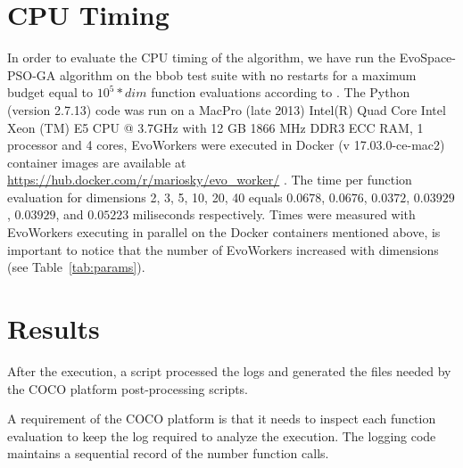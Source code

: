 \documentclass[sigconf]{acmart}
\begin{document}
%
\section{CPU Timing}
In order to evaluate the CPU timing of the algorithm, we have run the EvoSpace-PSO-GA algorithm 
on the  bbob test suite \cite{hansen2009fun} with no restarts for a maximum budget 
equal to  $10^5*dim$ function evaluations according to \cite{hansen2016exp}. 
The Python (version 2.7.13) code was run on a MacPro (late 2013) Intel(R) Quad Core 
Intel Xeon (TM) E5 CPU @ 3.7GHz with 12 GB 1866 MHz DDR3 ECC RAM, 1 processor and 4 cores, 
EvoWorkers were executed in Docker (v 17.03.0-ce-mac2) container images are available at
\url{https://hub.docker.com/r/mariosky/evo_worker/} . 
The time per function evaluation for dimensions 2, 3, 5, 10, 20, 40 equals $0.0678$, $0.0676$,
$0.0372$, $0.03929$, $0.03929$, and $0.05223$  miliseconds respectively. 
Times were measured with EvoWorkers executing in parallel on the Docker containers
mentioned above, is important to notice that the number of EvoWorkers increased 
with dimensions (see Table~\ref{tab:params}). 



\section{Results}

After the  execution, a script processed the logs and 
generated the files needed by the COCO platform \cite{hansen2016cocoplat}  post-processing scripts. 

A requirement of the COCO platform is that it needs 
to inspect each function evaluation to keep the log required 
to analyze the execution. The logging code maintains 
a sequential record of the number function calls. 
\end{document}
